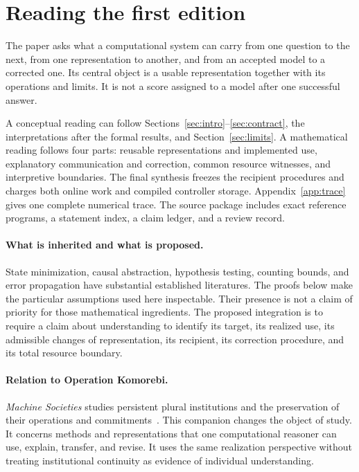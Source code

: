 \documentclass[11pt,letterpaper]{article}
\theoremstyle{plain}
\theoremstyle{definition}
\begin{document}
\hypersetup{pageanchor=true}
\begingroup\small\setlength{\parskip}{0pt}\tableofcontents\endgroup
\clearpage
\section*{Reading the first edition}
The paper asks what a computational system can carry from one question to the next, from one representation to another, and from an accepted model to a corrected one. Its central object is a usable representation together with its operations and limits. It is not a score assigned to a model after one successful answer.

A conceptual reading can follow Sections~\ref{sec:intro}--\ref{sec:contract}, the interpretations after the formal results, and Section~\ref{sec:limits}. A mathematical reading follows four parts: reusable representations and implemented use, explanatory communication and correction, common resource witnesses, and interpretive boundaries. The final synthesis freezes the recipient procedures and charges both online work and compiled controller storage. Appendix~\ref{app:trace} gives one complete numerical trace. The source package includes exact reference programs, a statement index, a claim ledger, and a review record.

\paragraph{What is inherited and what is proposed.}
State minimization, causal abstraction, hypothesis testing, counting bounds, and error propagation have substantial established literatures. The proofs below make the particular assumptions used here inspectable. Their presence is not a claim of priority for those mathematical ingredients. The proposed integration is to require a claim about understanding to identify its target, its realized use, its admissible changes of representation, its recipient, its correction procedure, and its total resource boundary.

\paragraph{Relation to Operation Komorebi.}
\emph{Machine Societies} studies persistent plural institutions and the preservation of their operations and commitments~\cite{societies}. This companion changes the object of study. It concerns methods and representations that one computational reasoner can use, explain, transfer, and revise. It uses the same realization perspective without treating institutional continuity as evidence of individual understanding. 
\end{document}
